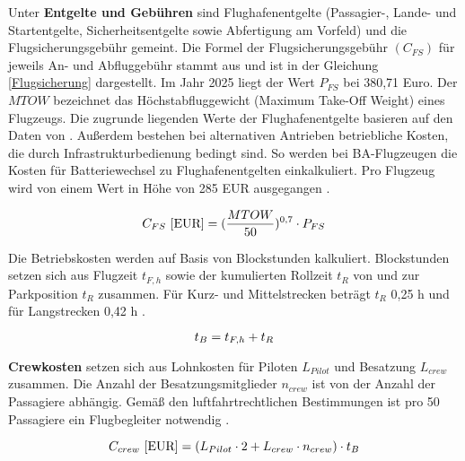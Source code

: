 Unter \textbf{Entgelte und Gebühren} sind Flughafenentgelte (Passagier-, Lande- und Startentgelte, Sicherheitsentgelte sowie Abfertigung am 
Vorfeld) und die Flugsicherungsgebühr gemeint. 
Die Formel der Flugsicherungsgebühr $(C_{FS})$ für jeweils An- und Abfluggebühr stammt aus \cite{dfs_flugsicherungsgebuehren} und ist in der Gleichung \eqref{Flugsicherung}
dargestellt. Im Jahr 2025 liegt der Wert $P_{FS}$ bei 380,71 Euro. 
Der $MTOW$ bezeichnet das Höchstabfluggewicht (Maximum Take-Off Weight) eines Flugzeugs. 
Die zugrunde liegenden Werte der Flughafenentgelte basieren auf den Daten von \cite{fraport2025entgelte}.
Außerdem bestehen bei alternativen Antrieben betriebliche Kosten, die durch Infrastrukturbedienung bedingt sind.
So werden bei BA-Flugzeugen die Kosten für Batteriewechsel zu Flughafenentgelten einkalkuliert. 
Pro Flugzeug wird von einem Wert in Höhe von 285 EUR ausgegangen \cite{guo2023infrastructure}.

\begin{equation}
   {C_{FS} ~[\text{EUR}]} = (\frac{MTOW}{50})^{0,7} \cdot P_{FS} \\
   \label{Flugsicherung}
\end{equation}

Die Betriebskosten werden auf Basis von Blockstunden kalkuliert. 
Blockstunden setzen sich aus Flugzeit $t_{F,h}$ sowie der kumulierten Rollzeit $t_{R}$ von und zur Parkposition $t_{R}$ zusammen. 
Für Kurz- und Mittelstrecken beträgt $t_{R}$ {0,25 h} und für Langstrecken 0,42 h \cite{scholz_design_evaluation_doc}.

\begin{equation}
   t_{B} = t_{F,h} + t_{R} \\
   \label{blockzeit}
\end{equation}

\textbf{Crewkosten} setzen sich aus Lohnkosten für Piloten $L_{Pilot}$ und Besatzung $L_{crew}$ zusammen. 
Die Anzahl der Besatzungsmitglieder $n_{crew}$ ist von der Anzahl der Passagiere abhängig. 
Gemäß den luftfahrtrechtlichen Bestimmungen ist pro 50 Passagiere ein Flugbegleiter notwendig \cite{conrady2019luftverkehr}.

\begin{equation}
   {C_{crew} ~[\text{EUR}]} = ({L}_{Pilot} \cdot 2 + {L}_{crew} \cdot n_{crew} ) \cdot t_{B} \\
   \label{crew cost}
\end{equation}


